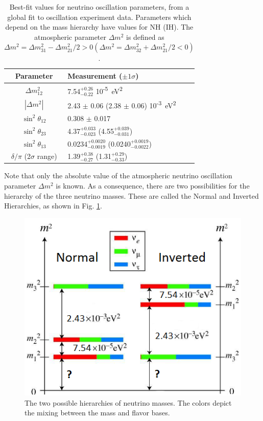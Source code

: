 \begin{table}[!htbp]
\caption{Best-fit values for neutrino oscillation parameters, from a global fit to oscillation experiment data.   Parameters which depend on the mass hierarchy have values for NH (IH).  The atmospheric parameter $\Delta m^{2}$ is defined as $\Delta m^{2} = \Delta m_{31}^{2} - \Delta m_{21}^{2}/2 > 0 (\Delta m^{2} = \Delta m_{32}^{2} + \Delta m_{21}^{2}/2 < 0)$. \cite{ReviewNuMass}} %
\label{table:nu_osc_vals}
\begin{tabular}{c|l}
Parameter & Measurement ($\pm 1 \sigma$) \\
\hline
$\Delta m_{12}^{2}$ & 7.54$^{+0.26}_{-0.22}$ 10\textsuperscript{-5}~eV\textsuperscript{2}\\
$|\Delta m^{2}|$ & 2.43 $\pm$ 0.06 (2.38 $\pm$ 0.06) 10\textsuperscript{-3}~eV\textsuperscript{2}\\
$\sin^{2} \theta_{12}$ & 0.308 $\pm$ 0.017\\
$\sin^{2} \theta_{23}$ & 4.37$^{+0.033}_{-0.023}$ (4.55$^{+0.039}_{-0.031}$)\\
$\sin^{2} \theta_{13}$ & 0.0234$^{+0.0020}_{-0.0019}$ (0.0240$^{+0.0019}_{-0.0022}$)\\
$\delta / \pi$ (2$\sigma$ range)& 1.39$^{+0.38}_{-0.27}$ (1.31$^{+0.29}_{-0.33}$)\\
\end{tabular}
\end{table}

Note that only the absolute value of the atmospheric neutrino oscillation parameter $\Delta m^{2}$ is known.  As a consequence, there are two possibilities for the hierarchy of the three neutrino masses.  These are called the Normal and Inverted Hierarchies, as shown in Fig. \ref{fig:numasshier}.

\begin{figure} %
        \centering
                \includegraphics[width=.5\textwidth]{figures/hierarchy_alterred.png}
                \caption{The two possible hierarchies of neutrino masses.  The colors depict the mixing between the mass and flavor bases.}
\label{fig:numasshier}
\end{figure}

